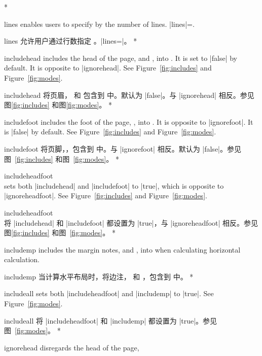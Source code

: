 \begin{Options}
\begin{paracol}{2}
\switchcolumn[0]*
\item[lines] enables users to specify  by the number
   of lines. |lines|=.
   \switchcolumn
   \item[lines] 允许用户通过行数指定 。|lines=|。
\switchcolumn[0]*
\item[includehead] includes the head of the page, 
   and , into . It is set to |false| by
   default. It is opposite to |ignorehead|. See
   Figure~\ref{fig:includes} and Figure~\ref{fig:modes}.
   \switchcolumn
   \item[includehead] 将页眉， 和  包含到  中。默认为 |false|。与 |ignorehead| 相反。参见图\ref{fig:includes} 和图\ref{fig:modes}。
\switchcolumn[0]*
\item[includefoot] includes the foot of the page, ,
   into . It is opposite to |ignorefoot|.
   It is |false| by default. See Figure~\ref{fig:includes} and
   Figure~\ref{fig:modes}.
   \switchcolumn
   \item[includefoot] 将页脚，，包含到  中。与 |ignorefoot| 相反。默认为 |false|。参见图~\ref{fig:includes} 和图~\ref{fig:modes}。
   \switchcolumn[0]*
\item[includeheadfoot]~\\ 
   sets both |includehead| and |includefoot| to |true|, which is opposite
   to |ignoreheadfoot|. See Figure~\ref{fig:includes} and
   Figure~\ref{fig:modes}.
\switchcolumn
\item[includeheadfoot]~\\ 
将 |includehead| 和 |includefoot| 都设置为 |true|，与 |ignoreheadfoot| 相反。参见图\ref{fig:includes} 和图~\ref{fig:modes}。
\switchcolumn[0]*
\item[includemp] includes the margin notes,  
   and , into  when calculating horizontal
   calculation.
   \switchcolumn
   \item[includemp] 当计算水平布局时，将边注， 和 ，包含到  中。
\switchcolumn[0]*
\item[includeall] sets both |includeheadfoot| and |includemp| to
   |true|. See Figure~\ref{fig:modes}.
   \switchcolumn
   \item[includeall] 将 |includeheadfoot| 和 |includemp| 都设置为 |true|。参见图~\ref{fig:modes}。
\switchcolumn[0]*
\item[ignorehead] disregards the head of the page,

\end{paracol}
\end{Options}
